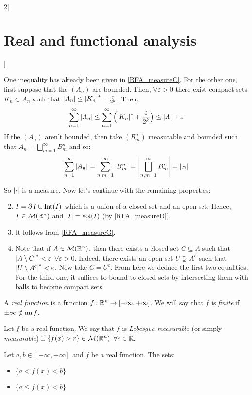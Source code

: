 \documentclass[../../../main_math.tex]{subfiles}
\begin{document}
\begin{multicols}{2}[\section{Real and functional analysis}]
\begin{sproof}
\begin{itemize}
            One inequality has already been given in \cref{RFA_measureC}. For the other one, first suppose that the $(A_n)$ are bounded. Then, $\forall \varepsilon >0$ there exist compact sets $K_n\subset A_n$ such that $\m{A_n}\leq \om{K_n}+\frac{\varepsilon}{2^k}$. Then:
            $$\sum_{n=1}^\infty \m{A_n}\leq \sum_{n=1}^\infty\left(\om{K_n}+\frac{\varepsilon}{2^k}\right)\leq \m{A}+\varepsilon$$
            If the $(A_n)$ aren't bounded, then take $(B_m^n)$ measurable and bounded such that $A_n=\bigsqcup_{m=1}^\infty B_m^n$ and so:
            $$\sum_{n=1}^\infty \m{A_n}=\sum_{n,m=1}^\infty \m{B_m^n}= \m{\bigsqcup_{n,m=1}^\infty B_m^n}=\m{A}$$
    \end{itemize}
    So $\m{\cdot}$ is a measure. Now let's continue with the remaining properties:
    \begin{enumerate}\setcounter{enumi}{1}
      \item $I=\operatorname{\partial}{I}\cup\operatorname{Int}(I)$ which is a union of a closed set and an open set. Hence, $I\in\mathcal{M}(\mathbb{R}^n)$ and $\m{I}=\vol(I)$ (by \cref{RFA_measureD}).
      \item It follows from \cref{RFA_measureG}.
      \item Note that if $A\in\mathcal{M}(\mathbb{R}^n)$, then there exists a closed set $C\subseteq A$ such that $\om{A\setminus C}<\varepsilon$ $\forall\varepsilon>0$. Indeed, there exists an open set $U\supseteq A^c$ such that $\om{U\setminus A^c}<\varepsilon$. Now take $C=U^c$. From here we deduce the first two equalities. For the third one, it suffices to bound to closed sets by intersecting them with balls to become compact sets.
    \end{enumerate}
  \end{sproof}
  \begin{definition}
    A \emph{real function} is a function $f:\mathbb{R}^n\rightarrow[-\infty,+\infty]$. We will say that $f$ is \emph{finite} if $\pm\infty\notin\operatorname{im} f$.
  \end{definition}
  \begin{definition}
    Let $f$ be a real function. We say that $f$ is \emph{Lebesgue measurable} (or simply \emph{measurable}) if $\{f(x)> r\}\in \mathcal{M}(\mathbb{R}^n)$ $\forall r\in\mathbb{R}$.
  \end{definition}
  \begin{lemma}\label{RFA_lemmamesurable}
    Let $a,b\in[-\infty,+\infty]$ and $f$ be a real function. The sets:
    \begin{itemize}
      \item $\{a<f(x)<b\}$
      \item $\{a\leq f(x)<b\}$

\end{itemize}
\end{lemma}
\end{multicols}
\end{document}
